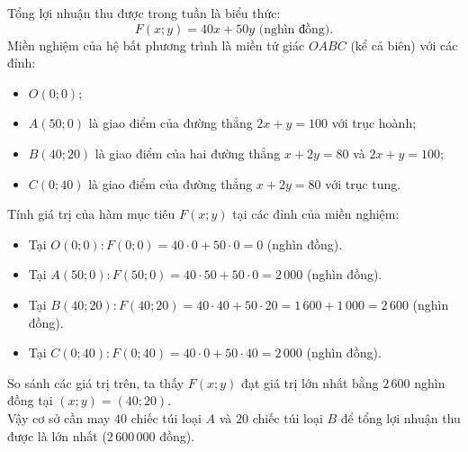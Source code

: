 \begin{ex}
{\begin{center}
		\end{center}
		Tổng lợi nhuận thu được trong tuần là biểu thức:
		$$F(x; y) = 40x + 50y\text{ (nghìn đồng)}.$$
		Miền nghiệm của hệ bất phương trình là miền tứ giác $OABC$ (kể cả biên) với các đỉnh:
		\begin{itemize}
			\item $O(0; 0)$;
			\item $A(50; 0)$ là giao điểm của đường thẳng $2x + y = 100$ với trục hoành;
			\item $B(40; 20)$ là giao điểm của hai đường thẳng $x + 2y = 80$ và $2x + y = 100$;
			\item $C(0; 40)$ là giao điểm của đường thẳng $x + 2y = 80$ với trục tung.
		\end{itemize}
		Tính giá trị của hàm mục tiêu $F(x; y)$ tại các đỉnh của miền nghiệm:
		\begin{itemize}
			\item Tại $O(0; 0)\colon F(0; 0) = 40 \cdot 0 + 50 \cdot 0 = 0$ (nghìn đồng).
			\item Tại $A(50; 0)\colon F(50; 0) = 40 \cdot 50 + 50 \cdot 0 = 2\,000$ (nghìn đồng).
			\item Tại $B(40; 20)\colon F(40; 20) = 40 \cdot 40 + 50 \cdot 20 = 1\,600 + 1\,000 = 2\,600$ (nghìn đồng).
			\item Tại $C(0; 40)\colon F(0; 40) = 40 \cdot 0 + 50 \cdot 40 = 2\,000$ (nghìn đồng).
		\end{itemize}
		So sánh các giá trị trên, ta thấy $F(x; y)$ đạt giá trị lớn nhất bằng $2\,600$ nghìn đồng tại $(x; y) = (40; 20)$.\\
		Vậy cơ sở cần may $40$ chiếc túi loại $A$ và $20$ chiếc túi loại $B$ để tổng lợi nhuận thu được là lớn nhất ($2\,600\,000$ đồng).
	}
\end{ex}

